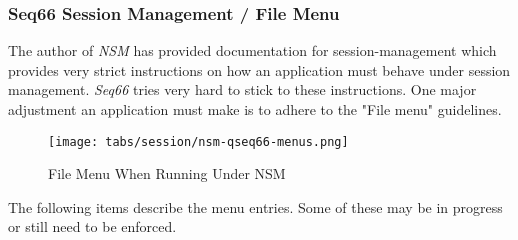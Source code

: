 \subsubsection{Seq66 Session Management / File Menu}
\label{subsubsec:sessions_file_menu}

   The author of \textsl{NSM} has provided documentation for session-management
   which provides very strict instructions on how an application must behave
   under session management.  \textsl{Seq66} tries very hard to stick to these
   instructions.  One major adjustment an application must make is to adhere to
   the "File menu" guidelines.

\begin{figure}[H]
   \centering 
   \texttt{[image: tabs/session/nsm-qseq66-menus.png]}
   \caption*{File Menu When Running Under NSM}
\end{figure}

   The following items describe the menu entries.  Some of these may be in
   progress or still need to be enforced.

